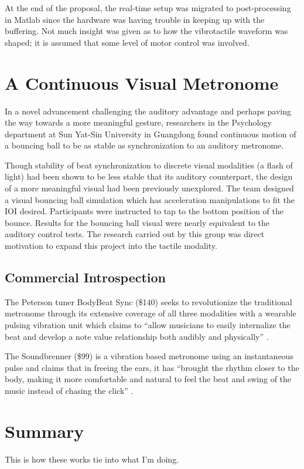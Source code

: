 At the end of the proposal, the real-time setup was migrated to post-processing in Matlab since the hardware was having trouble in keeping up with the buffering. Not much insight was given as to how the vibrotactile waveform was shaped; it is assumed that some level of motor control was involved.

\section{A Continuous Visual Metronome} \label{visualMet}
In a novel advancement challenging the auditory advantage and perhaps paving the way towards a more meaningful gesture, researchers in the Psychology department at Sun Yat-Sin University in Guangdong found continuous motion of a bouncing ball to be as stable as synchronization to an auditory metronome.
~\cite{gan2015synchronization}

Though stability of beat synchronization to discrete visual modalities (a flash of light) had been shown to be less stable that its auditory counterpart, the design of a more meaningful visual had been previously unexplored. The team designed a visual bouncing ball simulation which has acceleration manipulations to fit the IOI desired. Participants were instructed to tap to the bottom position of the bounce. Results for the bouncing ball visual were nearly equivalent to the auditory control tests. The research carried out by this group was direct motivation to expand this project into the tactile modality.

\subsection{Commercial Introspection} \label{commercial}
The Peterson tuner BodyBeat Sync (\$140) seeks to revolutionize the traditional metronome through its extensive coverage of all three modalities with a wearable pulsing vibration unit which claims to “allow musicians to easily internalize the beat and develop a note value relationship both audibly and physically” \cite{Peterson}.

The Soundbrenner (\$99) is a vibration based metronome using an instantaneous pulse and claims that in freeing the ears, it has “brought the rhythm closer to the body, making it more comfortable and natural to feel the beat and swing of the music instead of chasing the click” \cite{Soundbrenner}.

\section{Summary}
This is how these works tie into what I'm doing.
